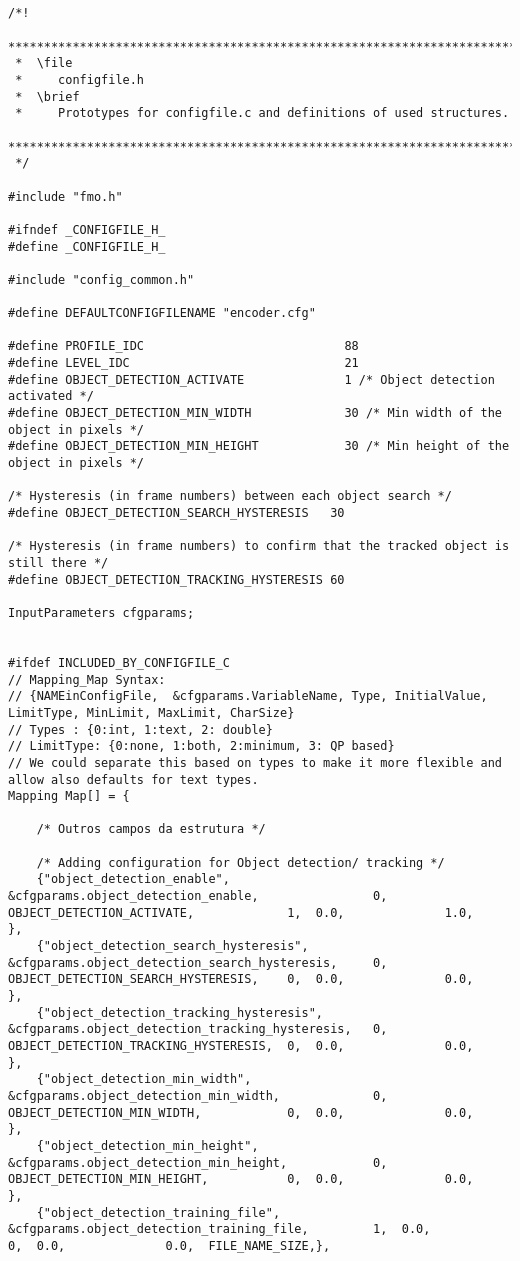 \begin{lstlisting}


/*!
 ***********************************************************************
 *  \file
 *     configfile.h
 *  \brief
 *     Prototypes for configfile.c and definitions of used structures.
 ***********************************************************************
 */

#include "fmo.h"

#ifndef _CONFIGFILE_H_
#define _CONFIGFILE_H_

#include "config_common.h"

#define DEFAULTCONFIGFILENAME "encoder.cfg"

#define PROFILE_IDC                            88
#define LEVEL_IDC                              21
#define OBJECT_DETECTION_ACTIVATE              1 /* Object detection activated */
#define OBJECT_DETECTION_MIN_WIDTH             30 /* Min width of the object in pixels */
#define OBJECT_DETECTION_MIN_HEIGHT            30 /* Min height of the object in pixels */

/* Hysteresis (in frame numbers) between each object search */
#define OBJECT_DETECTION_SEARCH_HYSTERESIS   30 

/* Hysteresis (in frame numbers) to confirm that the tracked object is still there */
#define OBJECT_DETECTION_TRACKING_HYSTERESIS 60 

InputParameters cfgparams;


#ifdef INCLUDED_BY_CONFIGFILE_C
// Mapping_Map Syntax:
// {NAMEinConfigFile,  &cfgparams.VariableName, Type, InitialValue, LimitType, MinLimit, MaxLimit, CharSize}
// Types : {0:int, 1:text, 2: double}
// LimitType: {0:none, 1:both, 2:minimum, 3: QP based}
// We could separate this based on types to make it more flexible and allow also defaults for text types.
Mapping Map[] = {
    
    /* Outros campos da estrutura */

    /* Adding configuration for Object detection/ tracking */
    {"object_detection_enable",                &cfgparams.object_detection_enable,                0,  OBJECT_DETECTION_ACTIVATE,             1,  0.0,              1.0,     },
    {"object_detection_search_hysteresis",     &cfgparams.object_detection_search_hysteresis,     0,  OBJECT_DETECTION_SEARCH_HYSTERESIS,    0,  0.0,              0.0,     },
    {"object_detection_tracking_hysteresis",   &cfgparams.object_detection_tracking_hysteresis,   0,  OBJECT_DETECTION_TRACKING_HYSTERESIS,  0,  0.0,              0.0,     },
    {"object_detection_min_width",             &cfgparams.object_detection_min_width,             0,  OBJECT_DETECTION_MIN_WIDTH,            0,  0.0,              0.0,     },
    {"object_detection_min_height",            &cfgparams.object_detection_min_height,            0,  OBJECT_DETECTION_MIN_HEIGHT,           0,  0.0,              0.0,     },
    {"object_detection_training_file",         &cfgparams.object_detection_training_file,         1,  0.0,                                   0,  0.0,              0.0,  FILE_NAME_SIZE,},


\end{lstlisting}
